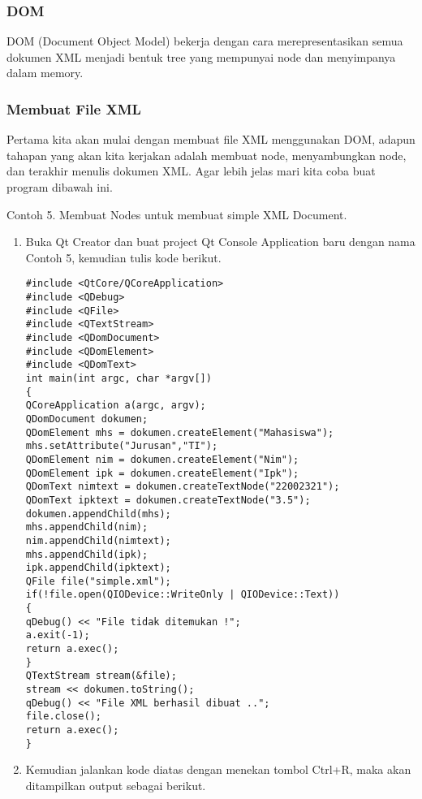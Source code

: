 \subsubsection{DOM}\label{dom}

DOM (Document Object Model) bekerja dengan cara merepresentasikan semua
dokumen XML menjadi bentuk tree yang mempunyai node dan menyimpanya
dalam memory.

\subsubsection{Membuat File XML}\label{membuat-file-xml}

Pertama kita akan mulai dengan membuat file XML menggunakan DOM, adapun
tahapan yang akan kita kerjakan adalah membuat node, menyambungkan node,
dan terakhir menulis dokumen XML. Agar lebih jelas mari kita coba buat
program dibawah ini.

Contoh 5. Membuat Nodes untuk membuat simple XML Document.

\begin{enumerate}
\def\labelenumi{\arabic{enumi}.}
\item
  Buka Qt Creator dan buat project Qt Console Application baru dengan
  nama Contoh 5, kemudian tulis kode berikut.

\begin{verbatim}
#include <QtCore/QCoreApplication>
#include <QDebug>
#include <QFile>
#include <QTextStream>
#include <QDomDocument>
#include <QDomElement>
#include <QDomText>
int main(int argc, char *argv[])
{
QCoreApplication a(argc, argv);
QDomDocument dokumen;
QDomElement mhs = dokumen.createElement("Mahasiswa");
mhs.setAttribute("Jurusan","TI");
QDomElement nim = dokumen.createElement("Nim");
QDomElement ipk = dokumen.createElement("Ipk");
QDomText nimtext = dokumen.createTextNode("22002321");
QDomText ipktext = dokumen.createTextNode("3.5");
dokumen.appendChild(mhs);
mhs.appendChild(nim);
nim.appendChild(nimtext);
mhs.appendChild(ipk);
ipk.appendChild(ipktext);
QFile file("simple.xml");
if(!file.open(QIODevice::WriteOnly | QIODevice::Text))
{
qDebug() << "File tidak ditemukan !";
a.exit(-1);
return a.exec();
}
QTextStream stream(&file);
stream << dokumen.toString();
qDebug() << "File XML berhasil dibuat ..";
file.close();
return a.exec();
}
\end{verbatim}
\item
  Kemudian jalankan kode diatas dengan menekan tombol Ctrl+R, maka akan
  ditampilkan output sebagai berikut.
\end{enumerate}

